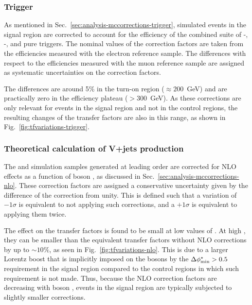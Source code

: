 
\subsubsection{Trigger}
As mentioned in Sec.~\ref{sec:analysis-mccorrections-trigger}, simulated events 
in the signal region are corrected to account for the efficiency of the 
combined suite of \scalht-\alphat, \met-\mht, and pure \scalht triggers. The 
nominal values of the correction factors are taken from the efficiencies 
measured with the electron reference sample. The differences with respect to 
the efficiencies measured with the muon reference sample are assigned as 
systematic uncertainties on the correction factors. 

The differences are around 
5\% in the turn-on region (\mht$\approx200$~GeV) and are practically zero in 
the efficiency plateau (\mht$>300$~GeV). 
As these corrections are only relevant for events in the signal region and not 
in the control regions, the resulting changes of the transfer factors are also 
in this range, as shown in Fig.~\ref{fig:tfvariations-trigger}. 

\subsubsection{Theoretical calculation of V+jets production}
The \zj and \wj simulation samples generated at leading order are corrected for 
NLO effects as a function of boson \pt, as discussed in 
Sec.~\ref{sec:analysis-mccorrections-nlo}.
These correction factors are assigned a conservative uncertainty given by 
the difference of the correction from unity.
This is defined such that a variation of $-1\sigma$ 
is equivalent to not applying such corrections, and a $+1\sigma$ is equivalent 
to applying them twice.

The effect on the transfer factors is found to be small at low values of 
\scalht. At high \scalht, they can be smaller than the equivalent transfer 
factors without NLO corrections by up to $\sim10\%$, as seen in 
Fig.~\ref{fig:tfvariations-nlo}.
This is due to a larger Lorentz boost that is implicitly imposed 
on the bosons by the $\mbox{$\Delta\phi^{*}_{\mathrm{min}}$}>0.5$ requirement in the signal region compared to 
the control regions in which such requirement is not made. Thus, because the 
NLO correction factors are decreasing with boson \pt, events in the 
signal region are typically subjected to slightly smaller corrections.

